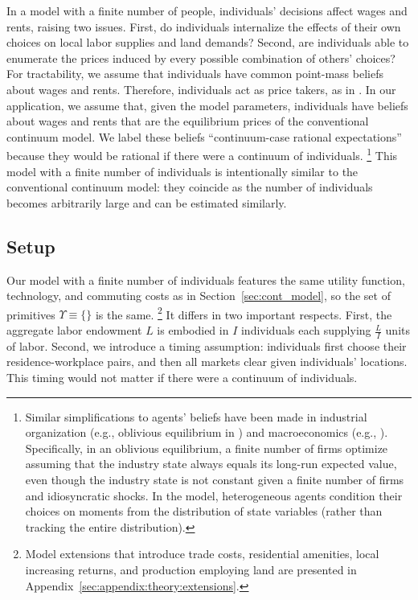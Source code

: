 \documentclass[11pt]{article}
\theoremstyle{definition}
\begin{document}
In a model with a finite number of people, individuals' decisions affect wages and rents, raising two issues.
First, do individuals internalize the effects of their own choices on local labor supplies and land demands?
Second, are individuals able to enumerate the prices induced by every possible combination of others' choices?
For tractability, we assume that individuals have common point-mass beliefs about wages and rents.
Therefore, individuals act as price takers, as in \cite{Gabaix:2011}.
In our application, we assume that,
given the model parameters,
individuals have beliefs about wages and rents that are the equilibrium prices of the conventional continuum model.
We label these beliefs ``continuum-case rational expectations''
because they would be rational if there were a continuum of individuals.%
\footnote{%
Similar simplifications to agents' beliefs have been made in industrial organization (e.g., oblivious equilibrium in \citealt{WeintraubBenkardVan-Roy:2008}) and macroeconomics (e.g., \citealt{KrusellSmith:1998}).
Specifically, in an oblivious equilibrium, a finite number of firms optimize assuming that the industry state always equals its long-run expected value,
even though the industry state is not constant given a finite number of firms and idiosyncratic shocks.
In the \cite{KrusellSmith:1998} model, heterogeneous agents condition their choices on moments from the distribution of state variables (rather than tracking the entire distribution).
}
This model with a finite number of individuals
is intentionally similar to the conventional continuum model:
they coincide as the number of individuals becomes arbitrarily large
and
can be estimated similarly.

\subsection{Setup}\label{sec:finitemodel:primitives}

Our model with a finite number of individuals features the same utility function, technology, and commuting costs as in Section~\ref{sec:cont_model},
so the set of primitives $\Upsilon\equiv \{$\primitiveslist $\}$ is the same.%
\footnote{Model extensions that introduce trade costs, residential amenities, local increasing returns, and production employing land are presented in Appendix~\ref{sec:appendix:theory:extensions}.}
It differs in two important respects.
First, the aggregate labor endowment $L$ is embodied in $I$ individuals each supplying $\frac{L}{I}$ units of labor.
Second, we introduce a timing assumption:
individuals first choose their residence-workplace pairs,
and
then all markets clear given individuals' locations.
This timing would not matter if there were a continuum of individuals.
\end{document}
